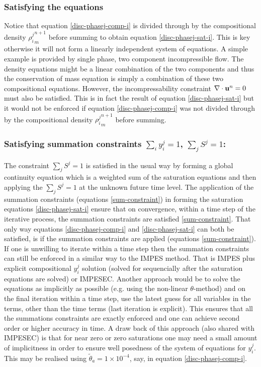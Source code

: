 \subsubsection{Satisfying the equations } 
Notice that equation \ref{disc-phasej-comp-i} is divided through by the 
compositional density ${\rho_i^j}_m^{n+1}$ before summing to obtain equation 
\ref{disc-phasej-sat-i}. This is key otherwise it will not form a 
linearly independent system of equations. A simple example is 
provided by single phase, two component incompressible flow. 
The density equations might be a linear combination of the 
two components and thus the conservation of 
mass equation is simply a combination of these two compositional 
equations. However, the incompressability constraint $\nabla \cdot {\bf u}^n=0$ 
must also be satisfied. This is in fact the result of 
equation \ref{disc-phasej-sat-i} but it would not be enforced 
if equation \ref{disc-phasej-comp-i} was not divided through by the 
compositional density ${\rho_i^j}_m^{n+1}$ before summing. 




\subsubsection{Satisfying summation constraints $\sum_i y_i^j=1$, $\sum_j S^j=1$:} 
The constraint $\sum_j S^j=1$ is satisfied in the usual way by 
forming a global continuity equation which is a weighted 
sum of the saturation equations and then applying the $\sum_j S^j=1$ at 
the unknown future time level. The application of 
the summation constraints (equations \ref{sum-constraint}) 
in forming the saturation equations \ref{disc-phasej-sat-i} ensure 
that on convergence, within a time step of the iterative process,  
the summation constraints are satisfied \ref{sum-constraint}. 
That only way equations \ref{disc-phasej-comp-i} 
and \ref{disc-phasej-sat-i} can both be satisfied, is if the 
summation constraints are applied (equations \ref{sum-constraint}). 
If one is unwilling to iterate within a time step then the 
summation constraints can still be enforced in a similar 
way to the IMPES method. 
That is IMPES plus explicit compositional $y_i^j$ solution 
(solved for sequencially after the saturation equations are solved) or IMPESEC. 
Another approach would be to solve the equations as implicitly 
as possible (e.g. using the non-linear $\theta$-method) and on the 
final iteration within a time step, use the latest guess for 
all variables in the terms, other than the time 
terms (last iteration is explicit). This ensures that 
all the summations constraints are exactly enforced and 
one can achieve second order or higher accuracy in time. 
A draw back of this approach (also shared with IMPESEC) is 
that for near zero or zero 
saturations one may need a small amount of 
implicitness in order to ensure well posedness of the 
system of equations for $y_i^j$. This may be realised using  
$\tilde\theta_a=1\times 10^{-4}$, say, 
in equation \ref{disc-phasej-comp-i}. 




